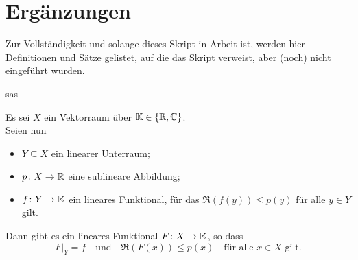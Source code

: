 

\section*{Ergänzungen} 


Zur Vollständigkeit und solange dieses Skript in Arbeit ist, werden hier Definitionen und Sätze gelistet, auf die das Skript verweist, aber (noch) nicht eingeführt wurden.


\begin{satz*}[Lebesgue]  \label{satz:x-Satz von Lebesgue}

	sas	
\end{satz*}


\begin{satznbfr}  \label{satz:x-hahn-banach}
	Es sei $X$ ein Vektorraum über $\mathbb{K} \in \{ \mathbb{R}, \mathbb{C} \}$. \\
	Seien nun
	\begin{itemize}
		\item $Y \subseteq X$ ein linearer Unterraum;
		\item $p \colon X \rightarrow \mathbb{R}$ eine sublineare Abbildung;
		\item $f \colon Y \rightarrow \mathbb{K}$ ein lineares Funktional, für das $\Re(f(y)) \leq p(y)$ für alle $y \in Y$ gilt.
	\end{itemize}
	Dann gibt es ein lineares Funktional $F \colon X \rightarrow \mathbb{K}$, so dass
	\[ F|_{Y} = f \quad \text{und} \quad \Re(F(x)) \leq p(x) \quad \text{für alle } x \in X \text{ gilt.} \]
\end{satznbfr}



\newpage